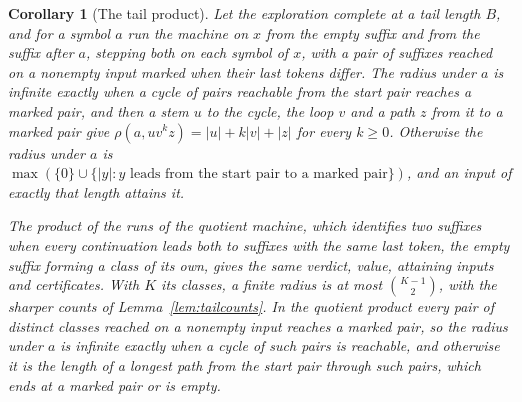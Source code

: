 \documentclass[11pt,a4paper]{article}
\theoremstyle{definition}
\theoremstyle{plain}
\newtheorem{corollary}{Corollary}
\begin{document}
\begin{corollary}[The tail product]\label{cor:tail}
Let the exploration complete at a tail length \(B\), and for a symbol \(a\) run the machine on \(x\) from the empty
suffix and from the suffix after \(a\), stepping both on each symbol of \(x\), with a pair of suffixes reached on a
nonempty input \emph{marked} when their last tokens differ. The radius under \(a\) is infinite exactly when a cycle of
pairs reachable from the start pair reaches a marked pair, and then a stem \(u\) to the cycle, the loop \(v\) and a path
\(z\) from it to a marked pair give \(\rho(a, u v^k z) = |u| + k|v| + |z|\) for every \(k \ge 0\). Otherwise the radius
under \(a\) is \(\max(\{0\} \cup \{|y| : y \text{ leads from the start pair to a marked pair}\})\), and an input of
exactly that length attains it.

The product of the runs of the \emph{quotient machine}, which identifies two suffixes when every continuation leads both
to suffixes with the same last token, the empty suffix forming a class of its own, gives the same verdict, value,
attaining inputs and certificates. With \(K\) its classes, a finite radius is at most \(\binom{K - 1}{2}\), with the
sharper counts of Lemma~\ref{lem:tailcounts}. In the quotient product every pair of distinct classes reached on a
nonempty input reaches a marked pair, so the radius under \(a\) is infinite exactly when a cycle of such pairs is
reachable, and otherwise it is the length of a longest path from the start pair through such pairs, which ends at a
marked pair or is empty.


\end{corollary}
\end{document}
